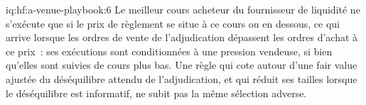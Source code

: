 \begin{solution}{iq:hf:a-venue-playbook:6}
Le meilleur cours acheteur du fournisseur de liquidité ne s'exécute que si le prix de règlement se situe à ce cours ou en dessous, ce qui arrive lorsque les ordres de vente de l'adjudication dépassent les ordres d'achat à
ce prix~: ses exécutions sont conditionnées à une pression vendeuse, si bien qu'elles sont suivies de cours plus bas. Une règle qui cote autour d'une fair value ajustée du
déséquilibre attendu de l'adjudication, et qui réduit ses tailles lorsque le déséquilibre est informatif, ne subit pas la même sélection adverse.
\end{solution}
